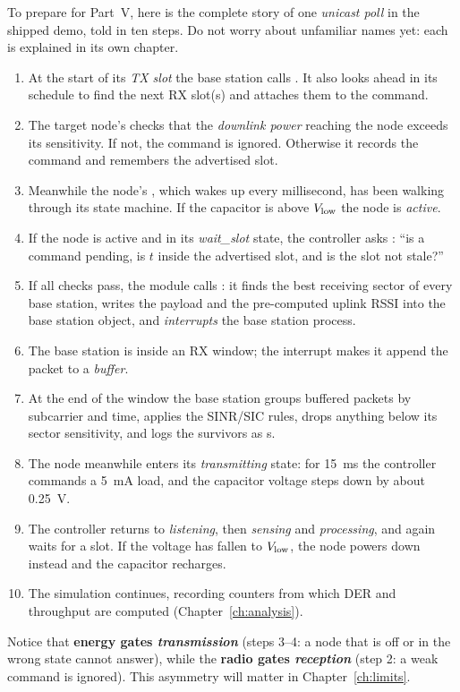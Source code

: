 To prepare for Part~V, here is the complete story of one \emph{unicast
poll} in the shipped  demo, told in ten steps. Do not worry about
unfamiliar names yet: each is explained in its own chapter.
\begin{enumerate}[label=\textbf{\arabic*.}]
 \item At the start of its \emph{TX slot} the base station
   calls . It also looks ahead in its
   schedule to find the next RX slot(s) and attaches them to the command.
 \item The target node's  checks that the \emph{downlink power}
   reaching the node exceeds its sensitivity. If not, the command is ignored. Otherwise
   it records the command and remembers the advertised slot.
 \item Meanwhile the node's , which wakes up every millisecond,
   has been walking through its state machine. If the capacitor is above
   $V_{\mathrm{low}}$ the node is \emph{active}.
 \item If the node is active and in its \emph{wait\_slot} state, the controller asks
   : ``is a command pending, is $t$ inside the advertised
   slot, and is the slot not stale?''
 \item If all checks pass, the module calls : it finds the
   best receiving sector of every base station, writes the payload and the
   pre-computed uplink RSSI into the base station object, and \emph{interrupts} the
   base station process.
 \item The base station is inside an RX window; the interrupt makes it append
   the packet to a \emph{buffer}.
 \item At the end of the window the base station groups buffered packets by
   subcarrier and time, applies the SINR/SIC rules, drops anything below its
   sector sensitivity, and logs the survivors as s.
 \item The node meanwhile enters its \emph{transmitting} state: for
   \SI{15}{ms} the controller commands a \SI{5}{mA} load, and the capacitor
   voltage steps down by about \SI{0.25}{V}.
 \item The controller returns to \emph{listening}, then \emph{sensing} and
   \emph{processing}, and again waits for a slot. If the voltage has fallen to
   $V_{\mathrm{low}}$, the node powers down instead and the capacitor recharges.
 \item The simulation continues, recording counters from which DER and
   throughput are computed (Chapter~\ref{ch:analysis}).
\end{enumerate}
Notice that \textbf{energy gates \emph{transmission}} (steps 3--4: a node that is
off or in the wrong state cannot answer), while the \textbf{radio gates
\emph{reception}} (step 2: a weak command is ignored). This asymmetry will matter in Chapter~\ref{ch:limits}.

